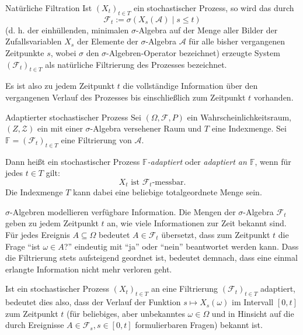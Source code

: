 \begin{defi}[Filtration]{Natürliche Filtration}
    Ist $(X_{t})_{t\in T}$ ein stochastischer Prozess, so wird das durch
    \[
        \mathcal{F}_{t}:=\sigma ({X_{s}({\mathcal{A}}) \mid s\leq t})
    \]
    (d. h. der einhüllenden, minimalen $\sigma$-Algebra auf der Menge aller Bilder der Zufallsvariablen $X_{s}$ der Elemente der $\sigma$-Algebra $\mathcal{A}$ für alle bisher vergangenen Zeitpunkte $s$, wobei $\sigma$ den $\sigma$-Algebren-Operator bezeichnet) erzeugte System $({\mathcal{F}}_{t})_{t\in T}$ als natürliche Filtrierung des Prozesses bezeichnet.

    Es ist also zu jedem Zeitpunkt $t$ die vollständige Information über den vergangenen Verlauf des Prozesses bis einschließlich zum Zeitpunkt $t$ vorhanden.
\end{defi}

\begin{defi}{Adaptierter stochastischer Prozess}
    Sei $(\Omega, \mathcal{F}, P)$ ein Wahrscheinlichkeitsraum, $(Z, \mathcal{Z})$ ein mit einer $\sigma$-Algebra versehener Raum und $T$ eine Indexmenge.
    Sei $\mathbb{F} = ({\mathcal{F}}_{t})_{t\in T}$ eine Filtrierung von $\mathcal{A}$.

    Dann heißt ein stochastischer Prozess \emph{$\mathbb{F}$-adaptiert} oder \emph{adaptiert an $\mathbb{F}$}, wenn für jedes $t \in T$ gilt:
    \[
        X_t \text{ ist }{\mathcal{F}}_{t}\text{-messbar}.
    \]
    Die Indexmenge $T$ kann dabei eine beliebige totalgeordnete Menge sein.

    $\sigma$-Algebren modellieren verfügbare Information.
    Die Mengen der $\sigma$-Algebra $\mathcal{F}_{t}$ geben zu jedem Zeitpunkt $t$ an, wie viele Informationen zur Zeit bekannt sind.
    Für jedes Ereignis $A\subseteq \Omega$ bedeutet $A\in{\mathcal{F}}_{t}$ übersetzt, dass zum Zeitpunkt $t$ die Frage \enquote{ist $\omega \in A$?} eindeutig mit \enquote{ja} oder \enquote{nein} beantwortet werden kann.
    Dass die Filtrierung stets aufsteigend geordnet ist, bedeutet demnach, dass eine einmal erlangte Information nicht mehr verloren geht.

    Ist ein stochastischer Prozess $(X_{t})_{t\in T}$ an eine Filtrierung $({\mathcal{F}}_{t})_{t\in T}$ adaptiert, bedeutet dies also, dass der Verlauf der Funktion $s\mapsto X_{s}(\omega )$ im Intervall $[0,t]$ zum Zeitpunkt $t$ (für beliebiges, aber unbekanntes $\omega \in \Omega$ und in Hinsicht auf die durch Ereignisse $A\in{\mathcal{F}}_{s},s\in [0,t]$ formulierbaren Fragen) bekannt ist.
\end{defi}

